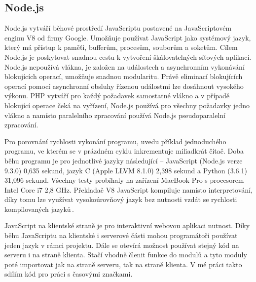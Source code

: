 \subsection{Node.js}
Node.js vytváří běhové prostředí JavaScriptu postavené na JavaScriptovém enginu V8 od firmy Google. Umožňuje používat JavaScript jako systémový jazyk, který má přístup k paměťi, bufferům, procesům, souborům a soketům. Cílem Node.js je poskytovat snadnou cestu k vytvoření škálovatelných síťových aplikací. Node.js nepoužívá vlákna, je založen na událostech a asynchronním vykonávání blokujících operací, umožňuje snadnou modularitu. Právě eliminací blokujících operací pomocí asynchronní obsluhy řízenou událostmi lze dosáhnout vysokého výkonu. PHP vytváří pro každý požadavek samostatné vlákno a v případě blokující operace čeká na vyřízení, Node.js používá pro všechny požadavky jedno vlákno a namísto paralelního zpracování používá Node.js pseudoparalelní zpracování.

Pro porovnání rychlosti vykonání programu, uvedu příklad jednoduchého programu, ve kterém se v prázdném cyklu inkrementuje miliadkrát čítač. Doba běhu programu je pro jednotlivé jazyky následující -- JavaScript (Node.js verze 9.3.0) 0,635 sekund, jazyk C (Apple LLVM 8.1.0) 2,398 sekund a Python (3.6.1) 31,096 sekund. Všechny testy probíhaly na zařízení MacBook Pro s procesorem Intel Core i7 2,8 GHz. Překladač V8 JavaScript kompiluje namísto interpretování, díky tomu lze využívat vysokoúrovňový jazyk bez nutnosti vzdát se rychlosti kompilovaných jazyků\,\cite{MasteringNodejs}.

JavaScript na klientské straně je pro interaktivní webovou aplikaci nutnost. Díky běhu JavaScriptu na klientské i serverové části mohou programátoři používat jeden jazyk v rámci projektu. Dále se otevírá možnost používat stejný kód na serveru i na straně klienta. Stačí vhodně členit funkce do modulů a tyto moduly poté importovat jak na straně serveru, tak na straně klienta. V mé práci takto sdílím kód pro práci s časovými značkami.

